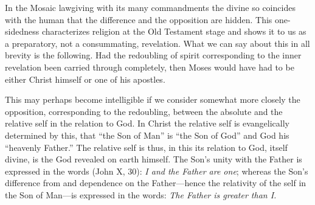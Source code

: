 \documentclass[12pt]{book}
\begin{document}
In the Mosaic lawgiving with its many commandments the divine so
coincides with the human that the difference and the opposition are
hidden. This one-sidedness characterizes religion at the Old Testament
stage and shows it to us as a preparatory, not a consummating, revelation.
What we can say about this in all brevity is the following. Had the
redoubling of spirit corresponding to the inner revelation been carried
through completely, then Moses would have had to be either Christ himself
or one of his apostles.

This may perhaps become intelligible if we consider somewhat more closely
the opposition, corresponding to the redoubling, between the absolute and
the relative self in the relation to God. In Christ the relative self is
evangelically determined by this, that ``the Son of Man'' is ``the Son of
God'' and God his ``heavenly Father.'' The relative self is thus, in this
its relation to God, itself divine, is the God revealed on earth himself.
The Son's unity with the Father is expressed in the words (John X, 30):
\textit{I and the Father are one}; whereas the Son's difference from and
dependence on the Father---hence the relativity of the self in the Son of
Man---is expressed in the words: \textit{The Father is greater than I.}
\end{document}

